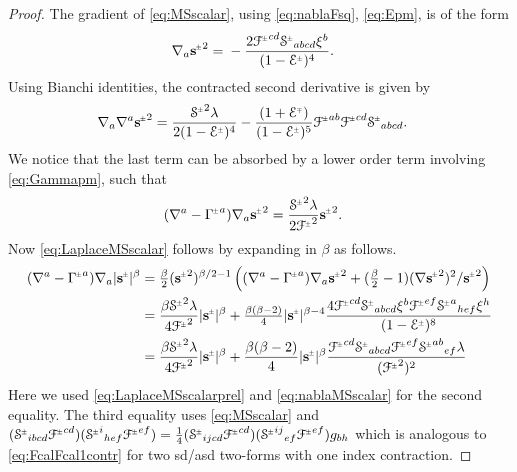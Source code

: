 \documentclass[a4paper,10pt,reqno]{amsart}
\newcommand{\Scal}{\mathop{\rm Scal}}
\theoremstyle{plain}
\newcommand{\PM}[1]{{{#1}^{\hspace{-.5pt}\scaleto{\pm}{3.5pt}}}}
\newcommand{\MP}[1]{{{#1}^{\hspace{-.5pt}\scaleto{\mp}{3.5pt}}}}
\def\Fcal{\mathcal{F}}
\def\Ecal{\mathcal{E}}
\def\Scal{\mathcal{S}}
\def\sbold{\mathbf{s}}
\numberwithin{equation}{section}
\begin{document}
\begin{proof}
The gradient of \eqref{eq:MSscalar}, using  \eqref{eq:nablaFsq}, \eqref{eq:Epm}, is of the form
\begin{align} \label{eq:nablaMSscalar}
\nabla_{a}\PM{\sbold}^2 ={}& - \frac{2 \PM{\Fcal}^{cd} \PM{\Scal}_{abcd} \xi^{b}}{(1 - \PM{\Ecal})^4}.
\end{align}
Using Bianchi identities, the contracted second derivative is given by 
\begin{align}\label{eq:MSid}
\nabla_{a}\nabla^{a}\PM{\sbold}^2={}& \frac{ \PM{\Scal}^2 \lambda}{2 (1 - \PM{\Ecal})^4} - \frac{ (1 +  \MP{\Ecal})}{ (1 - \PM{\Ecal})^5} \PM{\Fcal}^{ab} \PM{\Fcal}^{cd} \PM{\Scal}_{abcd}.
\end{align}
We notice that the last term can be absorbed by a lower order term involving \eqref{eq:Gammapm}, such that
\begin{align} \label{eq:LaplaceMSscalarprel}
(\nabla^{a} - \PM{\Gamma}^{a}) \nabla_{a}\PM{\sbold}^2 ={}&\frac{\PM{\Scal}^2 \lambda}{2 \PM{\Fcal}^2} \PM{\sbold}^2.
\end{align}
Now \eqref{eq:LaplaceMSscalar} follows by expanding in $\beta$ as follows.
\begin{align*} 
(\nabla^{a} - \PM{\Gamma}^{a}) \nabla_{a}|\PM{\sbold}|^\beta ={}& \tfrac{\beta}{2} (\PM{\sbold}^2)^{\beta/2-1} \left((\nabla^{a} - \PM{\Gamma}^{a}) \nabla_{a}\PM{\sbold}^2 + (\tfrac{\beta}{2} - 1)   (\nabla\PM{\sbold}^2 )^2 / \PM{\sbold}^{2}\right) \\
={}& \frac{\beta \PM{\Scal}^2 \lambda}{4 \PM{\Fcal}^2} |\PM{\sbold}|^\beta + \tfrac{\beta(\beta-2)}{4} |\PM{\sbold}|^{\beta-4} \frac{4 \PM{\Fcal}^{cd} \PM{\Scal}_{abcd} \xi^{b}\PM{\Fcal}^{ef} \PM{\Scal}^a{}_{hef} \xi^{h}}{(1 - \PM{\Ecal})^8} \\
={}& \frac{\beta \PM{\Scal}^2 \lambda}{4 \PM{\Fcal}^2} |\PM{\sbold}|^\beta + 
\frac{\beta(\beta-2)}{4} |\PM{\sbold}|^{\beta} \frac{ \PM{\Fcal}^{cd} \PM{\Scal}_{abcd} \PM{\Fcal}^{ef} \PM{\Scal}^{ab}{}_{ef} \lambda}{(\PM{\Fcal}^2)^2} \
\end{align*}
Here we used \eqref{eq:LaplaceMSscalarprel} and \eqref{eq:nablaMSscalar} for the second equality. The third equality uses \eqref{eq:MSscalar} and
$ (\PM{\Scal}_{ibcd}\PM{\Fcal}^{cd}) (\PM{\Scal}^i{}_{hef}\PM{\Fcal}^{ef}) = \frac{1}{4} (\PM{\Scal}_{ijcd}\PM{\Fcal}^{cd} )(  \PM{\Scal}^{ij}{}_{ef}\PM{\Fcal}^{ef}) g_{bh}$ which is analogous to \eqref{eq:FcalFcal1contr} for two sd/asd two-forms with one index contraction.
\end{proof}
\end{document}
